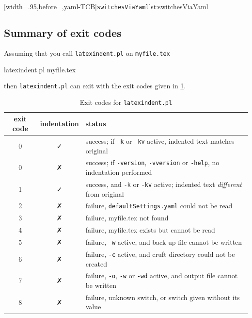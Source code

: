  [width=.95\linewidth,before=\centering,yaml-TCB]{\texttt{switchesViaYaml}}{lst:switchesViaYaml}

\subsection{Summary of exit codes}
 Assuming that you call \texttt{latexindent.pl} on \texttt{myfile.tex}

 \begin{commandshell}
latexindent.pl myfile.tex
\end{commandshell}

 then \texttt{latexindent.pl} can exit with the exit codes given in
 \cref{tab:exit-codes}.

 \begin{table}[!htb]
  \caption{Exit codes for \texttt{latexindent.pl}}
  \label{tab:exit-codes}
  \begin{tabular}{ccl}
   \toprule
   exit code & indentation & status                                                                                        \\
   \midrule
   0         & \faCheck    & success; if \texttt{-k} or \texttt{-kv} active, indented text matches original                \\
   0         & \faClose    & success; if \texttt{-version}, \texttt{-vversion} or \texttt{-help}, no indentation performed \\
   1         & \faCheck    & success, and \texttt{-k} or \texttt{-kv} active; indented text \emph{different} from original \\
   \midrule
   2         & \faClose    & failure, \texttt{defaultSettings.yaml} could not be read                                      \\
   3         & \faClose    & failure, myfile.tex not found                                                                 \\
   4         & \faClose    & failure, myfile.tex exists but cannot be read                                                 \\
   5         & \faClose    & failure, \texttt{-w} active, and back-up file cannot be written                               \\
   6         & \faClose    & failure, \texttt{-c} active, and cruft directory could not be created                         \\
   7         & \faClose    & failure, \texttt{-o}, \texttt{-w} or \texttt{-wd} active, and output file cannot be written   \\
   8         & \faClose    & failure, unknown switch, or switch given without its value                                    \\
   \bottomrule
  \end{tabular}
 \end{table}
